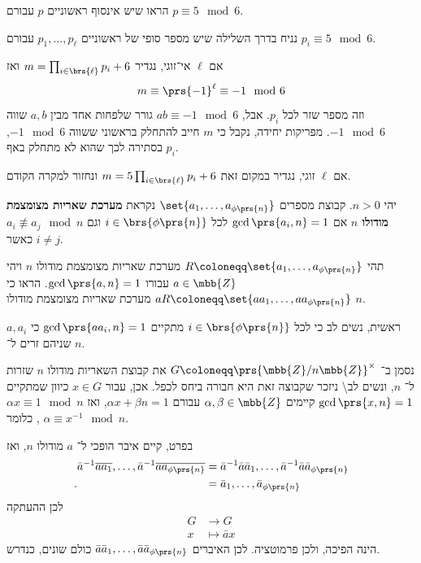 \documentclass[a4paper,10pt,twoside,openany]{book}
\begin{document}
\begin{exercisechap}
הראו שיש אינסוף ראשוניים
$p$
עבורם
$p \equiv 5 \mod{6}$.
\end{exercisechap}

\begin{solution}
נניח בדרך השלילה שיש מספר סופי של ראשוניים
$p_1, \ldots, p_\ell$
עבורם
$p_i \equiv 5 \mod{6}$.

אם
$\ell$
אי־זוגי, נגדיר
$m = \prod_{i \in \brs{\ell}} p_i + 6$
ואז
\[m \equiv \prs{-1}^\ell \equiv -1 \mod{6}\]
וזה מספר שזר לכל
$p_i$.
אבל,
$ab \equiv -1 \mod{6}$
גורר שלפחות אחד מבין
$a,b$
שווה
$-1 \mod{6}$.
מפריקות יחידה, נקבל כי
$m$
חייב להתחלק בראשוני ששווה
$-1 \mod{6}$,
בסתירה לכך שהוא לא מתחלק באף
$p_i$.

אם
$\ell$
זוגי, נגדיר במקום זאת
$m = 5 \prod_{i \in \brs{\ell}} p_i + 6$
ונחזור למקרה הקודם.
\end{solution}

\begin{exercisechap}
יהי
$n > 0$.
קבוצת מספרים
$\set{a_1, \ldots, a_{\phi\prs{n}}}$
נקראת
\textbf{מערכת שאריות מצומצמת מודולו $n$}
אם
$\gcd\prs{a_i, n} = 1$
לכל
$i \in \brs{\phi\prs{n}}$
וגם
$a_i \not\equiv a_j \mod{n}$
כאשר
$i \neq j$.

תהי
$R \coloneqq \set{a_1, \ldots, a_{\phi\prs{n}}}$
מערכת שאריות מצומצמת מודולו
$n$
ויהי
$a \in \mbb{Z}$
עבורו
$\gcd\prs{a,n} = 1$.
הראו כי
$aR \coloneqq \set{a a_1, \ldots, a a_{\phi\prs{n}}}$
מערכת שאריות מצומצמת מודולו
$n$.
\end{exercisechap}

\begin{solution}
ראשית, נשים לב כי לכל
$i \in \brs{\phi\prs{n}}$
מתקיים
$\gcd\prs{a a_i, n} = 1$
כי
$a, a_i$
שניהם זרים ל־%
$n$.

נסמן ב־%
$G \coloneqq \prs{\mbb{Z} / n \mbb{Z}}^\times$
את קבוצת השאריות מודולו
$n$
שזרות ל־%
$n$,
ונשים לב\textbackslash%
ניזכר שקבוצה זאת היא חבורה ביחס לכפל.
אכן, עבור
$x \in G$
כיוון שמתקיים
$\gcd\prs{x,n} = 1$
קיימים
$\alpha, \beta \in \mbb{Z}$
עבורם
$\alpha x + \beta n = 1$,
ואז
$\alpha x \equiv 1 \mod{n}$,
כלומר
$\alpha \equiv x^{-1} \mod{n}$.

בפרט, קיים איבר הופכי ל־%
$a$
מודולו
$n$,
ואז
\begin{align*}
\bar{a}^{-1} \overline{a a_1}, \ldots, \bar{a}^{-1} \overline{a a_{\phi\prs{n}}}
&=
\bar{a}^{-1} \bar{a} \bar{a}_1, \ldots, \bar{a}^{-1} \bar{a} \bar{a}_{\phi\prs{n}}
\\ \text{.}\hphantom{\bar{a}^{-1} \overline{a a_1}, \ldots, \bar{a}^{-1} \overline{a a_{\phi\prs{n}}}} &=
\bar{a}_1, \ldots, \bar{a}_{\phi\prs{n}}
\end{align*}
לכן ההעתקה
\begin{align*}
G &\to G \\
x &\mapsto \bar{a}x
\end{align*}
הינה הפיכה, ולכן פרמוטציה. לכן האיברים
$\bar{a} \bar{a}_1, \ldots, \bar{a} \bar{a}_{\phi\prs{n}}$
כולם שונים, כנדרש.
\end{solution}
\end{document}
